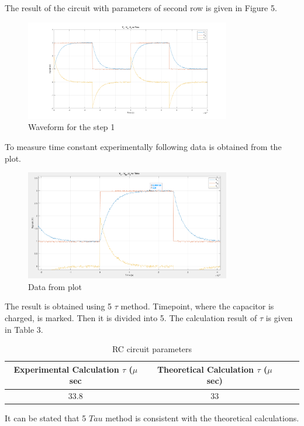 \documentclass[letterpaper,12pt]{article}
\begin{document}
The result of the circuit with parameters of second row is given in Figure 5.

\begin{figure}[H]
	\centering
   \includegraphics[width=0.8\textwidth]{1a_2.png}
   \caption{Waveform for the step 1}
\end{figure} 
To measure time constant experimentally following data is obtained from the plot.
\begin{figure}[H]
	\centering
   \includegraphics[width=0.8\textwidth]{1_2_plot_data.png}
   \caption{Data from plot}
\end{figure} 
The result is obtained using 5 \(\tau\) method. Timepoint, where the capacitor is charged, is marked. Then it is divided into 5. The calculation result of \(\tau\) is given in Table 3.
\begin{table}[H]
	\begin{center}
	\caption{RC circuit parameters}
	\vspace{2mm}
		\begin{tabular}{||c | c | c | c||} 
		 \hline
		 Experimental Calculation \(\tau\) (\(\mu\) sec & Theoretical Calculation \(\tau\) (\(\mu\) sec) \\ [0.5ex] 
		 \hline\hline
		 33.8 & 33 \\ 
		 \hline
	\end{tabular}
	\end{center}
	\end{table}
It can be stated that 5 \(Tau\) method is consistent with the theoretical calculations. \\
\end{document}
